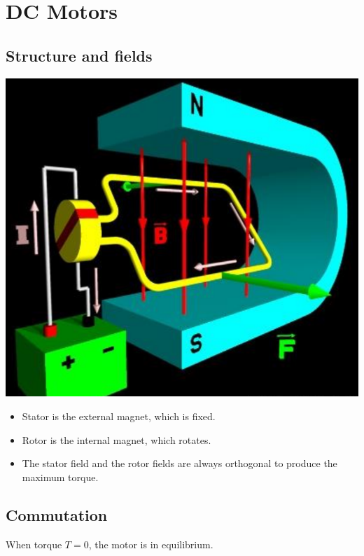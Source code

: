 \documentclass[11pt]{article}
\begin{document}
\section{DC Motors}
\label{sec:org050450f}

\subsection{Structure and fields}
\label{sec:orgf15abe5}
\begin{center}
\includegraphics[width=.9\linewidth]{./images/dc-motor-structure.png}
\end{center}

\begin{itemize}
\item Stator is the external magnet, which is fixed.
\item Rotor is the internal magnet, which rotates.
\item The stator field and the rotor fields are always orthogonal to produce the maximum torque.
\end{itemize}

 \newpage
\subsection{Commutation}
\label{sec:orgdd383e1}
When torque \(T = 0\), the motor is in equilibrium.
\end{document}
